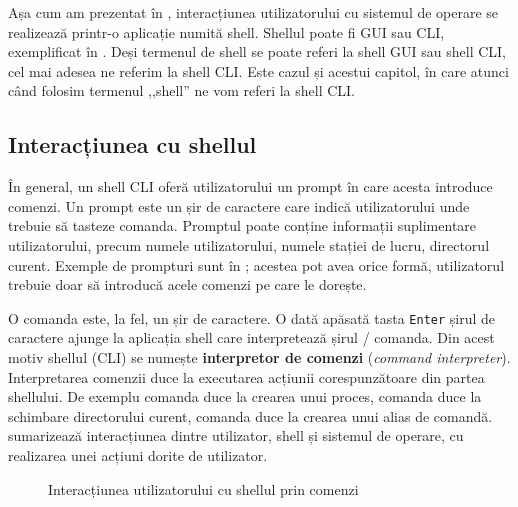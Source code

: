 Așa cum am prezentat în , interacțiunea utilizatorului cu sistemul de operare se realizează printr-o aplicație numită shell.
Shellul poate fi GUI sau CLI, exemplificat în .
Deși termenul de shell se poate referi la shell GUI sau shell CLI, cel mai adesea ne referim la shell CLI.
Este cazul și acestui capitol, în care atunci când folosim termenul ,,shell'' ne vom referi la shell CLI.

\subsection{Interacțiunea cu shellul}
\label{sec:cli:shell:interact}

În general, un shell CLI oferă utilizatorului un prompt în care acesta introduce comenzi.
Un prompt este un șir de caractere care indică utilizatorului unde trebuie să tasteze comanda.
Promptul poate conține informații suplimentare utilizatorului, precum numele utilizatorului, numele stației de lucru, directorul curent.
Exemple de prompturi sunt în ;
acestea pot avea orice formă, utilizatorul trebuie doar să introducă acele comenzi pe care le dorește.


O comanda este, la fel, un șir de caractere.
O dată apăsată tasta \texttt{Enter} șirul de caractere ajunge la aplicația shell care interpretează șirul / comanda.
Din acest motiv shellul (CLI) se numește \textbf{interpretor de comenzi} (\textit{command interpreter}).
Interpretarea comenzii duce la executarea acțiunii corespunzătoare din partea shellului.
De exemplu comanda  duce la crearea unui proces, comanda  duce la schimbare directorului curent, comanda  duce la crearea unui alias de comandă.
 sumarizează interacțiunea dintre utilizator, shell și sistemul de operare, cu realizarea unei acțiuni dorite de utilizator.

\begin{figure}[htbp]
  \centering
  \def\svgwidth{0.6\columnwidth}
  
  \caption{Interacțiunea utilizatorului cu shellul prin comenzi}
  \label{fig:cli:user-shell-cmd}
\end{figure}

